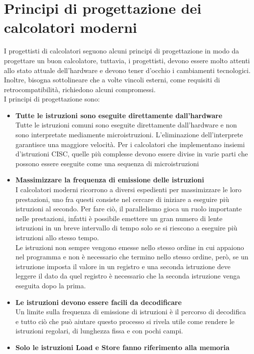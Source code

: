 \documentclass[12pt]{report}
\begin{document}
\section{Principi di progettazione dei calcolatori moderni}
I progettisti di calcolatori seguono alcuni principi di progettazione in modo da progettare un buon calcolatore, tuttavia, i progettisti, devono essere molto attenti allo stato attuale dell'hardware e devono tener d'occhio i cambiamenti tecnologici.
Inoltre, bisogna sottolineare che a volte vincoli esterni, come requisiti di retrocompatibilità, richiedono alcuni compromessi. \\
I principi di progettazione sono:
\begin{itemize}
	\item \textbf{Tutte le istruzioni sono eseguite direttamente dall'hardware} \\
	Tutte le istruzioni comuni sono eseguite direttamente dall'hardware e non sono interpretate mediamente microistruzioni. L'eliminazione dell'interprete garantisce una maggiore velocità. Per i calcolatori che implementano insiemi d'istruzioni CISC, quelle più complesse devono essere divise in varie parti che possono essere eseguite come una sequenza di microistruzioni
	\item \textbf{Massimizzare la frequenza di emissione delle istruzioni} \\
	I calcolatori moderni ricorrono a diversi espedienti per massimizzare le loro prestazioni, uno fra questi consiste nel cercare di iniziare a eseguire più istruzioni al secondo. Per fare ciò, il parallelismo gioca un ruolo importante nelle prestazioni, infatti è possibile emettere un gran numero di lente istruzioni in un breve intervallo di tempo solo se si riescono a eseguire più istruzioni allo stesso tempo. \\
	Le istruzioni non sempre vengono emesse nello stesso ordine in cui appaiono nel programma e non è necessario che termino nello stesso ordine, però, se un istruzione imposta il valore in un registro e una seconda istruzione deve leggere il dato da quel registro è necessario che la seconda istruzione venga eseguita dopo la prima.
	\item \textbf{Le istruzioni devono essere facili da decodificare} \\
	Un limite sulla frequenza di emissione di istruzioni è il percorso di decodifica e tutto ciò che può aiutare questo processo si rivela utile come rendere le istruzioni regolari, di lunghezza fissa e con pochi campi.
	\item \textbf{Solo le istruzioni Load e Store fanno riferimento alla memoria} \\

\end{itemize}
\end{document}
